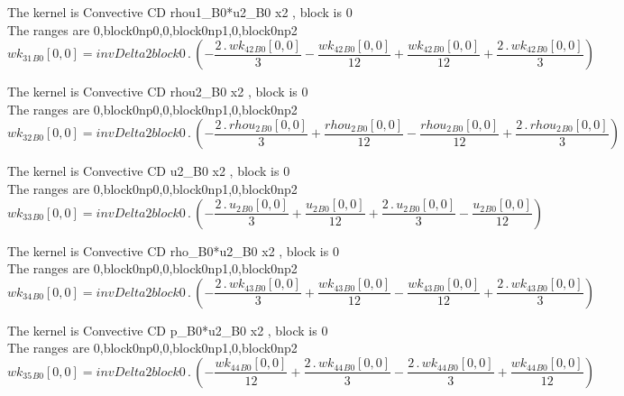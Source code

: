 \documentclass{article}
\begin{document}
\noindent The kernel is Convective CD rhou1_B0*u2_B0 x2 , block is 0\\\noindent The ranges are 0,block0np0,0,block0np1,0,block0np2\\\begin{dmath}{wk_{31}{_{B0}}}[{0,0}] = invDelta2block0 \,.\, \left(- \frac{2 \,.\, {wk_{42}{_{B0}}}[{0,0}]}{3} - \frac{{wk_{42}{_{B0}}}[{0,0}]}{12} + \frac{{wk_{42}{_{B0}}}[{0,0}]}{12} + \frac{2 \,.\, {wk_{42}{_{B0}}}[{0,0}]}{3}\right)\end{dmath}

\noindent The kernel is Convective CD rhou2_B0 x2 , block is 0\\\noindent The ranges are 0,block0np0,0,block0np1,0,block0np2\\\begin{dmath}{wk_{32}{_{B0}}}[{0,0}] = invDelta2block0 \,.\, \left(- \frac{2 \,.\, {rhou_{2}{_{B0}}}[{0,0}]}{3} + \frac{{rhou_{2}{_{B0}}}[{0,0}]}{12} - \frac{{rhou_{2}{_{B0}}}[{0,0}]}{12} + \frac{2 \,.\, {rhou_{2}{_{B0}}}[{0,0}]}{3}\right)\end{dmath}

\noindent The kernel is Convective CD u2_B0 x2 , block is 0\\\noindent The ranges are 0,block0np0,0,block0np1,0,block0np2\\\begin{dmath}{wk_{33}{_{B0}}}[{0,0}] = invDelta2block0 \,.\, \left(- \frac{2 \,.\, {u_{2}{_{B0}}}[{0,0}]}{3} + \frac{{u_{2}{_{B0}}}[{0,0}]}{12} + \frac{2 \,.\, {u_{2}{_{B0}}}[{0,0}]}{3} - \frac{{u_{2}{_{B0}}}[{0,0}]}{12}\right)\end{dmath}

\noindent The kernel is Convective CD rho_B0*u2_B0 x2 , block is 0\\\noindent The ranges are 0,block0np0,0,block0np1,0,block0np2\\\begin{dmath}{wk_{34}{_{B0}}}[{0,0}] = invDelta2block0 \,.\, \left(- \frac{2 \,.\, {wk_{43}{_{B0}}}[{0,0}]}{3} + \frac{{wk_{43}{_{B0}}}[{0,0}]}{12} - \frac{{wk_{43}{_{B0}}}[{0,0}]}{12} + \frac{2 \,.\, {wk_{43}{_{B0}}}[{0,0}]}{3}\right)\end{dmath}

\noindent The kernel is Convective CD p_B0*u2_B0 x2 , block is 0\\\noindent The ranges are 0,block0np0,0,block0np1,0,block0np2\\\begin{dmath}{wk_{35}{_{B0}}}[{0,0}] = invDelta2block0 \,.\, \left(- \frac{{wk_{44}{_{B0}}}[{0,0}]}{12} + \frac{2 \,.\, {wk_{44}{_{B0}}}[{0,0}]}{3} - \frac{2 \,.\, {wk_{44}{_{B0}}}[{0,0}]}{3} + \frac{{wk_{44}{_{B0}}}[{0,0}]}{12}\right)\end{dmath}
\end{document}
